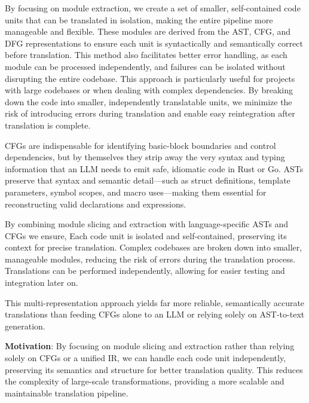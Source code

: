 \documentclass[twocolumn]{article}
\begin{document}
By focusing on module extraction, we create a set of smaller, self-contained code units that can be translated in isolation, making the entire pipeline more manageable and flexible. These modules are derived from the AST, CFG, and DFG representations to ensure each unit is syntactically and semantically correct before translation. This method also facilitates better error handling, as each module can be processed independently, and failures can be isolated without disrupting the entire codebase.
This approach is particularly useful for projects with large codebases or when dealing with complex dependencies. By breaking down the code into smaller, independently translatable units, we minimize the risk of introducing errors during translation and enable easy reintegration after translation is complete.

\medskip
\noindent
CFGs are indispensable for identifying basic-block boundaries and control dependencies, but by themselves they strip away the very syntax and typing information that an LLM needs to emit safe, idiomatic code in Rust or Go.  ASTs preserve that syntax and semantic detail—such as struct definitions, template parameters, symbol scopes, and macro uses—making them essential for reconstructing valid declarations and expressions. 

By combining module slicing and extraction with language-specific ASTs and CFGs we ensure, 
Each code unit is isolated and self-contained, preserving its context for precise translation. 
Complex codebases are broken down into smaller, manageable modules, reducing the risk of errors during the translation process. 
Translations can be performed independently, allowing for easier testing and integration later on. 

This multi-representation approach yields far more reliable, semantically accurate translations than feeding CFGs alone to an LLM or relying solely on AST-to-text generation.  

\textbf{Motivation}: By focusing on module slicing and extraction rather than relying solely on CFGs or a unified IR, we can handle each code unit independently, preserving its semantics and structure for better translation quality. This reduces the complexity of large-scale transformations, providing a more scalable and maintainable translation pipeline.
\end{document}
